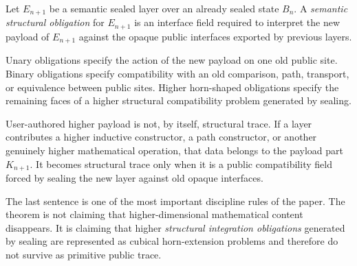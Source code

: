 \documentclass{lmcs}
\begin{document}
\begin{defi}
Let \(E_{n+1}\) be a semantic sealed layer over an already sealed state \(B_n\).  A
\emph{semantic structural obligation} for \(E_{n+1}\) is an interface field required to
interpret the new payload of \(E_{n+1}\) against the opaque public interfaces exported by
previous layers.

Unary obligations specify the action of the new payload on one old public site.  Binary
obligations specify compatibility with an old comparison, path, transport, or equivalence
between public sites.  Higher horn-shaped obligations specify the remaining faces of a
higher structural compatibility problem generated by sealing.

User-authored higher payload is not, by itself, structural trace.  If a layer contributes a
higher inductive constructor, a path constructor, or another genuinely higher mathematical
operation, that data belongs to the payload part \(K_{n+1}\).  It becomes structural trace
only when it is a public compatibility field forced by sealing the new layer against old
opaque interfaces.
\end{defi}

The last sentence is one of the most important discipline rules of the paper.  The theorem
is not claiming that higher-dimensional mathematical content disappears.  It is claiming that
higher \emph{structural integration obligations} generated by sealing are represented as
cubical horn-extension problems and therefore do not survive as primitive public trace.
\end{document}
